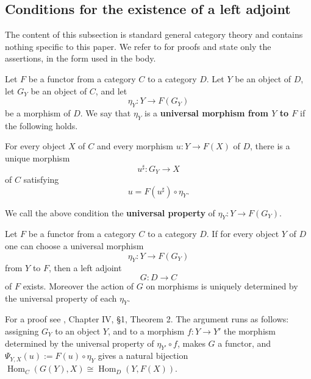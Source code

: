 \subsection{Conditions for the existence of a left adjoint}

The content of this subsection is standard general category theory and contains
nothing specific to this paper.
We refer to \cite{MacLane} for proofs and state only the assertions, in the form
used in the body.

\begin{definition}
  Let $F$ be a functor from a category $C$ to a category $D$.
  Let $Y$ be an object of $D$, let $G_Y$ be an object of $C$, and let
  \[
    \eta_Y:Y\to F(G_Y)
  \]
  be a morphism of $D$.
  We say that $\eta_Y$ is a \textbf{universal morphism from $Y$ to $F$} if the
  following holds.

  For every object $X$ of $C$ and every morphism $u:Y\to F(X)$ of $D$, there is
  a unique morphism
  \[
    u^\sharp:G_Y\to X
  \]
  of $C$ satisfying
  \[
    u=F(u^\sharp)\circ\eta_Y .
  \]

  We call the above condition the \textbf{universal property} of
  $\eta_Y:Y\to F(G_Y)$.
\end{definition}

\begin{theorem}\label{thm:left-adjunction-existence-from-universality}
  Let $F$ be a functor from a category $C$ to a category $D$.
  If for every object $Y$ of $D$ one can choose a universal morphism
  \[
    \eta_Y:Y\to F(G_Y)
  \]
  from $Y$ to $F$, then a left adjoint
  \[
    G:D\to C
  \]
  of $F$ exists.
  Moreover the action of $G$ on morphisms is uniquely determined by the
  universal property of each $\eta_Y$.
\end{theorem}

\noindent
For a proof see \cite{MacLane}, Chapter IV, \S1, Theorem 2.
The argument runs as follows: assigning $G_Y$ to an object $Y$, and to a
morphism $f:Y\to Y'$ the morphism determined by the universal property of
$\eta_{Y'}\circ f$, makes $G$ a functor, and
$\Psi_{Y,X}(u):=F(u)\circ\eta_Y$ gives a natural bijection
$\operatorname{Hom}_C(G(Y),X)\cong\operatorname{Hom}_D(Y,F(X))$.
